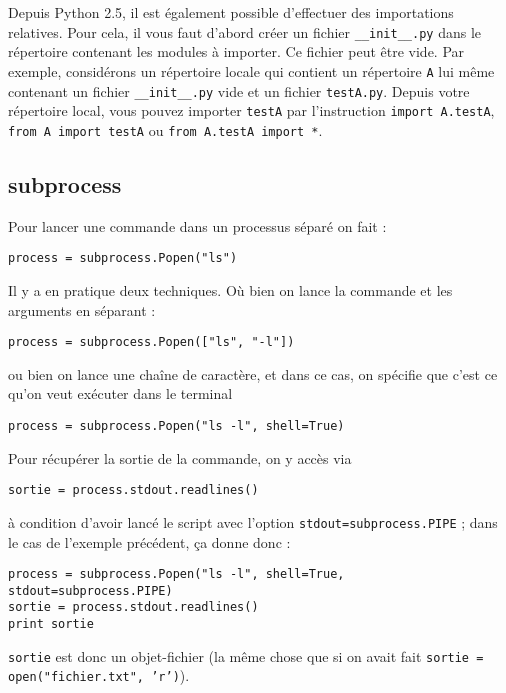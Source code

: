 \documentclass[a4paper,twoside]{article}
\begin{document}
\bigskip

Depuis Python 2.5, il est également possible d'effectuer des importations relatives. Pour cela, il vous faut d'abord créer un fichier \verb|__init__.py| dans le répertoire contenant les modules à importer. Ce fichier peut être vide. Par exemple, considérons un répertoire locale qui contient un répertoire \texttt{A} lui même contenant un fichier \verb|__init__.py| vide et un fichier \texttt{testA.py}. Depuis votre répertoire local, vous pouvez importer \texttt{testA} par l'instruction \texttt{import A.testA}, \texttt{from A import testA} ou \texttt{from A.testA import *}.

\subsection{subprocess}\label{sec:subprocess}
Pour lancer une commande dans un processus séparé on fait :
\begin{verbatim}
process = subprocess.Popen("ls")
\end{verbatim}

Il y a en pratique deux techniques. Où bien on lance la commande et les arguments en séparant :
\begin{verbatim}
process = subprocess.Popen(["ls", "-l"])
\end{verbatim}
ou bien on lance une chaîne de caractère, et dans ce cas, on spécifie que c'est ce qu'on veut exécuter dans le terminal
\begin{verbatim}
process = subprocess.Popen("ls -l", shell=True)
\end{verbatim}

\bigskip

Pour récupérer la sortie de la commande, on y accès via
\begin{verbatim}
sortie = process.stdout.readlines()
\end{verbatim}
à condition d'avoir lancé le script avec l'option \verb|stdout=subprocess.PIPE| ; dans le cas de l'exemple précédent, ça donne donc :
\begin{verbatim}
process = subprocess.Popen("ls -l", shell=True, stdout=subprocess.PIPE)
sortie = process.stdout.readlines()
print sortie
\end{verbatim}

\begin{remarque}
\verb|sortie| est donc un objet-fichier (la même chose que si on avait fait \texttt{sortie = open("fichier.txt", 'r')}).
\end{remarque}
\end{document}
